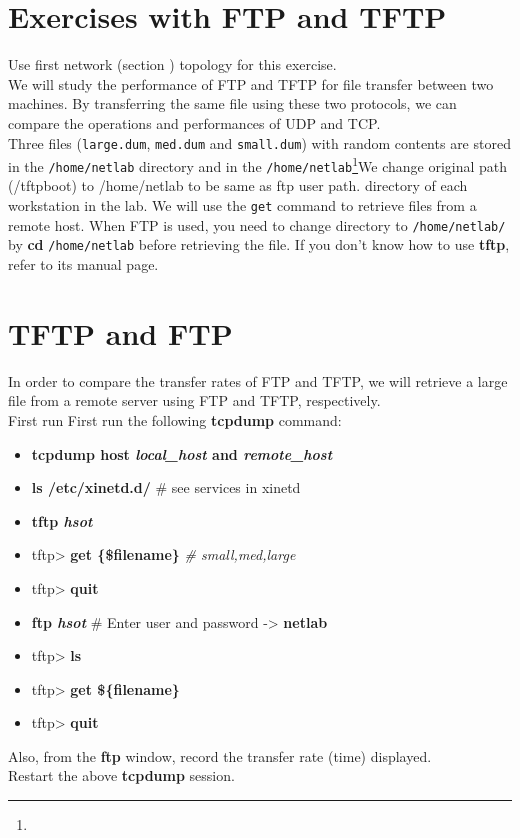\documentclass{../UTNetLab}
\begin{document}
\section*{Exercises with FTP and TFTP}
	Use first network (section ) topology for this exercise.\\
	We will study the performance of FTP and TFTP for file transfer between two machines.
	By transferring the same file using these two protocols, we can compare the operations and performances of UDP and TCP. \\
	Three files (\texttt{large.dum}, \texttt{med.dum} and \texttt{small.dum}) with random contents are stored in the \texttt{/home/netlab} directory and in the \texttt{/home/netlab}\footnote{}{We change original path (/tftpboot) to /home/netlab to be same as ftp user path.} directory of each workstation in the lab.
	We will use the \texttt{get} command to retrieve files from a remote host.
	When FTP is used, you need to change directory to \texttt{/home/netlab/} by \textbf{cd} \texttt{/home/netlab} before retrieving the file.
	If you don’t know how to use \textbf{tftp}, refer to its manual page.


\section{TFTP and FTP}
	In order to compare the transfer rates of FTP and TFTP, we will retrieve a large file from a remote server using FTP and TFTP, respectively.\\
	First run First run the following \textbf{tcpdump} command:
	\begin{itemize}
		\item \textbf{tcpdump host \textit{local\_host} and \textit{remote\_host}}
	\end{itemize}
	\begin{itemize}		
		\item \textbf{ls /etc/xinetd.d/} \# see services in xinetd
		\item \textbf{tftp \textit{hsot}}
		\item tftp> \textbf{get \{\$filename\}} \textit{\# small,med,large}
		\item tftp> \textbf{quit}
		\item \textbf{ftp \textit{hsot}} \# Enter user and password -> \textbf{netlab}
		\item tftp> \textbf{ls}
		\item tftp> \textbf{get \$\{filename\}}
		\item tftp> \textbf{quit}
	\end{itemize}
	Also, from the \textbf{ftp} window, record the transfer rate (time) displayed. \\
	Restart the above \textbf{tcpdump} session.
\end{document}
